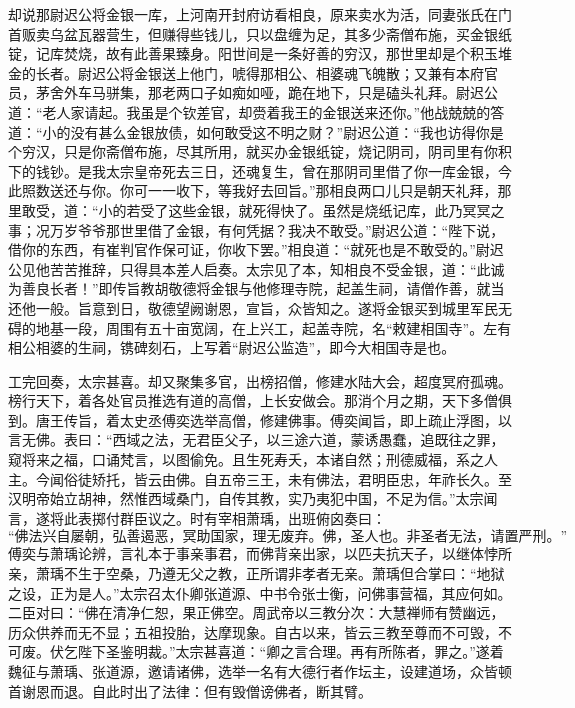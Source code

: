 \documentclass[12pt]{lsbook}
\begin{document}
却说那尉迟公将金银一库，上河南开封府访看相良，原来卖水为活，同妻张氏在门首贩卖乌盆瓦器营生，但赚得些钱儿，只以盘缠为足，其多少斋僧布施，买金银纸锭，记库焚烧，故有此善果臻身。阳世间是一条好善的穷汉，那世里却是个积玉堆金的长者。尉迟公将金银送上他门，唬得那相公、相婆魂飞魄散；又兼有本府官员，茅舍外车马骈集，那老两口子如痴如哑，跪在地下，只是磕头礼拜。尉迟公道：“老人家请起。我虽是个钦差官，却赍着我王的金银送来还你。”他战兢兢的答道：“小的没有甚么金银放债，如何敢受这不明之财？”尉迟公道：“我也访得你是个穷汉，只是你斋僧布施，尽其所用，就买办金银纸锭，烧记阴司，阴司里有你积下的钱钞。是我太宗皇帝死去三日，还魂复生，曾在那阴司里借了你一库金银，今此照数送还与你。你可一一收下，等我好去回旨。”那相良两口儿只是朝天礼拜，那里敢受，道：“小的若受了这些金银，就死得快了。虽然是烧纸记库，此乃冥冥之事；况万岁爷爷那世里借了金银，有何凭据？我决不敢受。”尉迟公道：“陛下说，借你的东西，有崔判官作保可证，你收下罢。”相良道：“就死也是不敢受的。”尉迟公见他苦苦推辞，只得具本差人启奏。太宗见了本，知相良不受金银，道：“此诚为善良长者！”即传旨教胡敬德将金银与他修理寺院，起盖生祠，请僧作善，就当还他一般。旨意到日，敬德望阙谢恩，宣旨，众皆知之。遂将金银买到城里军民无碍的地基一段，周围有五十亩宽阔，在上兴工，起盖寺院，名“敕建相国寺”。左有相公相婆的生祠，镌碑刻石，上写着“尉迟公监造”，即今大相国寺是也。

工完回奏，太宗甚喜。却又聚集多官，出榜招僧，修建水陆大会，超度冥府孤魂。榜行天下，着各处官员推选有道的高僧，上长安做会。那消个月之期，天下多僧俱到。唐王传旨，着太史丞傅奕选举高僧，修建佛事。傅奕闻旨，即上疏止浮图，以言无佛。表曰：“西域之法，无君臣父子，以三途六道，蒙诱愚蠢，追既往之罪，窥将来之福，口诵梵言，以图偷免。且生死寿夭，本诸自然；刑德威福，系之人主。今闻俗徒矫托，皆云由佛。自五帝三王，未有佛法，君明臣忠，年祚长久。至汉明帝始立胡神，然惟西域桑门，自传其教，实乃夷犯中国，不足为信。”太宗闻言，遂将此表掷付群臣议之。时有宰相萧瑀，出班俯囟奏曰：
\[
“佛法兴自屡朝，弘善遏恶，冥助国家，理无废弃。佛，圣人也。非圣者无法，请置严刑。”
\]
傅奕与萧瑀论辨，言礼本于事亲事君，而佛背亲出家，以匹夫抗天子，以继体悖所亲，萧瑀不生于空桑，乃遵无父之教，正所谓非孝者无亲。萧瑀但合掌曰：“地狱之设，正为是人。”太宗召太仆卿张道源、中书令张士衡，问佛事营福，其应何如。二臣对曰：“佛在清净仁恕，果正佛空。周武帝以三教分次：大慧禅师有赞幽远，历众供养而无不显；五祖投胎，达摩现象。自古以来，皆云三教至尊而不可毁，不可废。伏乞陛下圣鉴明裁。”太宗甚喜道：“卿之言合理。再有所陈者，罪之。”遂着魏征与萧瑀、张道源，邀请诸佛，选举一名有大德行者作坛主，设建道场，众皆顿首谢恩而退。自此时出了法律：但有毁僧谤佛者，断其臂。
\end{document}
